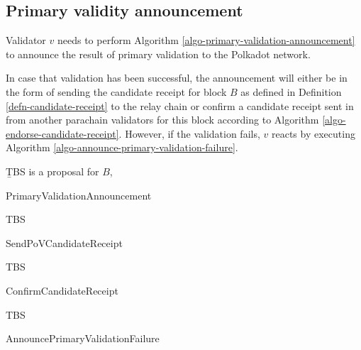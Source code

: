 \subsection{Primary validity announcement}
\label{sect-primary-validaty-announcement}
Validator $v$ needs to perform Algorithm \ref{algo-primary-validation-announcement} to announce the result of primary validation to the Polkadot network.

In case that validation has been successful, the announcement will either be in the form of sending the candidate receipt for block $B$ as defined in Definition \ref{defn-candidate-receipt} to the relay chain or confirm a candidate receipt sent in from another parachain validators for this block according to Algorithm \ref{algo-endorse-candidate-receipt}.
However, if the validation fails, $v$ reacts by executing Algorithm \ref{algo-announce-primary-validation-failure}.

\begin{definition}
  \label{defn-candidate-receipt}
        {\b TBS} is a proposal for $B$,
\end{definition}

\begin{algorithm}
  \caption[PrimaryValidationAnnouncement]{\sc PrimaryValidationAnnouncement}
  \label{algo-primary-validation-announcement}
  \begin{algorithmic}[1]
    \Require{}
    
    \State TBS
  \end{algorithmic}
\end{algorithm}

\begin{algorithm}
  \caption[]{\sc SendPoVCandidateReceipt}
  \label{algo-send-candidate-receipt}
  \begin{algorithmic}[1]
    \Require{}
    
    \State TBS
  \end{algorithmic}
\end{algorithm}

\begin{algorithm}
  \caption[]{\sc ConfirmCandidateReceipt}
  \label{algo-endorse-candidate-receipt}
  \begin{algorithmic}[1]
    \Require{}
    
    \State TBS
  \end{algorithmic}
\end{algorithm}

\begin{algorithm}
  \caption[]{\sc AnnouncePrimaryValidationFailure}
  \label{algo-announce-primary-validation-failure}
  \begin{algorithmic}[1]
    \Require{}
    
    \State
  \end{algorithmic}
\end{algorithm}

